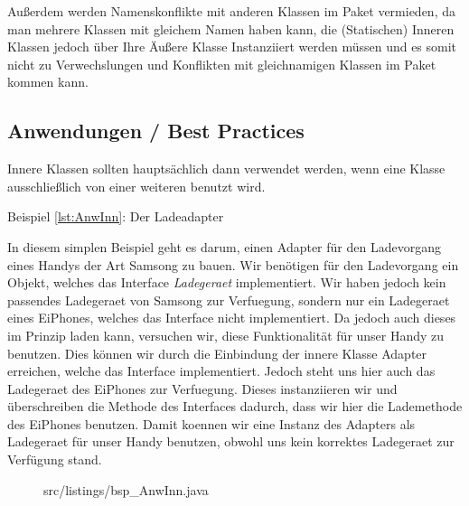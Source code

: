 Außerdem werden Namenskonflikte mit anderen Klassen im Paket vermieden, da man mehrere Klassen mit gleichem Namen haben kann, die (Statischen) Inneren Klassen jedoch über Ihre Äußere Klasse Instanziiert werden müssen und es somit nicht zu Verwechslungen und Konflikten mit gleichnamigen Klassen im Paket kommen kann.

\subsection{Anwendungen / Best Practices}

Innere Klassen sollten hauptsächlich dann verwendet werden, wenn eine Klasse ausschließlich von einer weiteren benutzt wird.

Beispiel \ref{lst:AnwInn}: Der Ladeadapter

In diesem simplen Beispiel geht es darum, einen Adapter für den Ladevorgang eines Handys der Art Samsong zu bauen.
Wir benötigen für den Ladevorgang ein Objekt, welches das Interface {\it Ladegeraet} implementiert.
Wir haben jedoch kein passendes Ladegeraet von Samsong zur Verfuegung, sondern nur ein Ladegeraet eines EiPhones, welches das Interface nicht implementiert.
Da jedoch auch dieses im Prinzip laden kann, versuchen wir, diese Funktionalität für unser Handy zu benutzen.
Dies können wir durch die Einbindung der innere Klasse Adapter erreichen, welche das Interface implementiert.
Jedoch steht uns hier auch das Ladegeraet des EiPhones zur Verfuegung.
Dieses instanziieren wir und überschreiben die Methode des Interfaces dadurch, dass wir hier die Lademethode des EiPhones benutzen.
Damit koennen wir eine Instanz des Adapters als Ladegeraet für unser Handy benutzen, obwohl uns kein korrektes Ladegeraet zur Verfügung stand.

\newpage
\begin{figure}[hb]
\lstset{language=Java}
 {src/listings/bsp_AnwInn.java}
\end{figure}


\newpage
